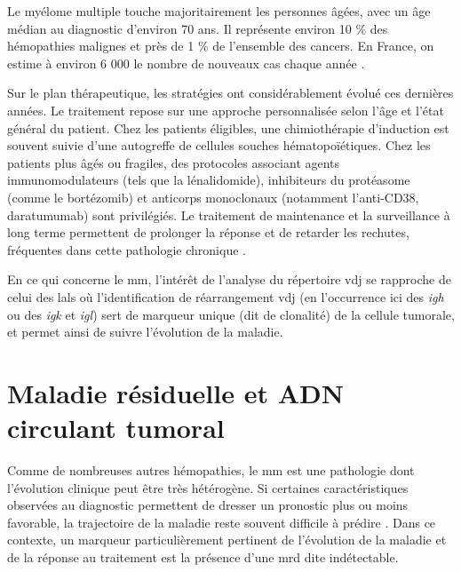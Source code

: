 Le myélome multiple touche majoritairement les personnes âgées, avec un âge médian au diagnostic d'environ 70 ans. Il représente environ 10 \%
des hémopathies malignes et près de 1 \% de l'ensemble des cancers. En France, on estime à environ 6 000 le nombre de nouveaux cas chaque année 
\cite{spfSurviePersonnesAtteintes}.

\vspace{1em}

Sur le plan thérapeutique, les stratégies ont considérablement évolué ces dernières années. Le traitement repose sur une approche personnalisée
selon l'âge et l'état général du patient. Chez les patients éligibles, une chimiothérapie d'induction est souvent suivie d'une autogreffe de cellules
souches hématopoïétiques. Chez les patients plus âgés ou fragiles, des protocoles associant agents immunomodulateurs (tels que la lénalidomide),
inhibiteurs du protéasome (comme le bortézomib) et anticorps monoclonaux (notamment l'anti-CD38, daratumumab) sont privilégiés. Le traitement de
maintenance et la surveillance à long terme permettent de prolonger la réponse et de retarder les rechutes, fréquentes dans cette pathologie chronique 
\cite{cowanDiagnosisManagementMultiple2022a}.

\vspace{1em}

En ce qui concerne le \gls{mm}, l'intérêt de l'analyse du répertoire \gls{vdj} se rapproche de celui des \glspl{lal} où l'identification 
de réarrangement \gls{vdj} (en l'occurrence ici des \textit{\gls{igh}} ou des \textit{\gls{igk}} et \textit{\gls{igl}}) sert de marqueur unique (dit de clonalité) 
de la cellule tumorale, et permet ainsi de suivre l'évolution de la maladie.

\section{Maladie résiduelle et ADN circulant tumoral}

Comme de nombreuses autres hémopathies, le \gls{mm} est une pathologie dont l'évolution clinique peut être très hétérogène. 
Si certaines caractéristiques observées au diagnostic permettent de dresser un pronostic plus ou moins favorable, 
la trajectoire de la maladie reste souvent difficile à prédire \cite{hanamuraMultipleMyelomaHighrisk2022}. 
Dans ce contexte, un marqueur particulièrement pertinent de l'évolution de la maladie et de la réponse au traitement 
est la présence d'une \gls{mrd} dite indétectable.

